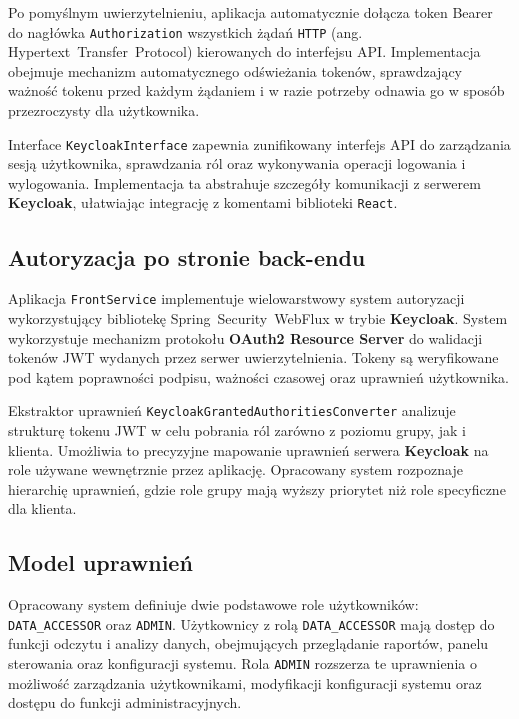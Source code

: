 Po pomyślnym uwierzytelnieniu, aplikacja automatycznie dołącza token Bearer do nagłówka \texttt{Authorization} wszystkich żądań \texttt{HTTP} (ang. \mbox{Hypertext Transfer Protocol}) kierowanych do interfejsu API. Implementacja obejmuje mechanizm automatycznego odświeżania tokenów, sprawdzający ważność tokenu przed każdym żądaniem i w razie potrzeby odnawia go w sposób przezroczysty dla użytkownika.

Interface \texttt{KeycloakInterface} zapewnia zunifikowany interfejs API do zarządzania sesją użytkownika, sprawdzania ról oraz wykonywania operacji logowania i wylogowania. Implementacja ta abstrahuje szczegóły komunikacji z serwerem \textbf{Keycloak}, ułatwiając integrację z komentami biblioteki \texttt{React}.

\subsection{Autoryzacja po stronie back-endu}

Aplikacja \texttt{FrontService} implementuje wielowarstwowy system autoryzacji wykorzystujący bibliotekę \mbox{Spring Security WebFlux} w trybie \textbf{Keycloak}. System wykorzystuje mechanizm protokołu \textbf{OAuth2 Resource Server} do walidacji tokenów \mbox{JWT} wydanych przez serwer uwierzytelnienia. Tokeny są weryfikowane pod kątem poprawności podpisu, ważności czasowej oraz uprawnień użytkownika.

Ekstraktor uprawnień \texttt{KeycloakGrantedAuthoritiesConverter} analizuje strukturę tokenu \mbox{JWT} w celu pobrania ról zarówno z poziomu grupy, jak i klienta. Umożliwia to precyzyjne mapowanie uprawnień serwera \textbf{Keycloak} na role używane wewnętrznie przez aplikację. Opracowany system rozpoznaje hierarchię uprawnień, gdzie role grupy mają wyższy priorytet niż role specyficzne dla klienta.

\subsection{Model uprawnień}

Opracowany system definiuje dwie podstawowe role użytkowników: \texttt{DATA\_ACCESSOR} oraz \texttt{ADMIN}. Użytkownicy z rolą \texttt{DATA\_ACCESSOR} mają dostęp do funkcji odczytu i analizy danych, obejmujących przeglądanie raportów, panelu sterowania oraz konfiguracji systemu. Rola \texttt{ADMIN} rozszerza te uprawnienia o możliwość zarządzania użytkownikami, modyfikacji konfiguracji systemu oraz dostępu do funkcji administracyjnych.

